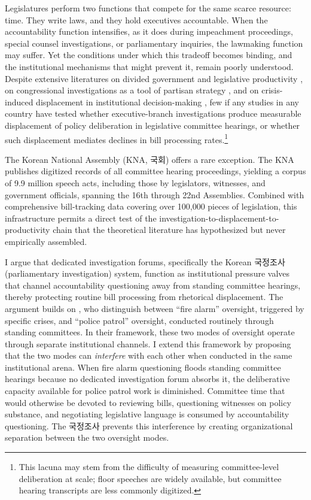 \documentclass[11pt]{article}
\begin{document}
Legislatures perform two functions that compete for the same scarce resource: time. They write laws, and they hold executives accountable. When the accountability function intensifies, as it does during impeachment proceedings, special counsel investigations, or parliamentary inquiries, the lawmaking function may suffer. Yet the conditions under which this tradeoff becomes binding, and the institutional mechanisms that might prevent it, remain poorly understood. Despite extensive literatures on divided government and legislative productivity \citep{mayhew1991, edwards1997}, on congressional investigations as a tool of partisan strategy \citep{kriner2008}, and on crisis-induced displacement in institutional decision-making \citep{epstein2005}, few if any studies in any country have tested whether executive-branch investigations produce measurable displacement of policy deliberation in legislative committee hearings, or whether such displacement mediates declines in bill processing rates.\footnote{This lacuna may stem from the difficulty of measuring committee-level deliberation at scale; floor speeches are widely available, but committee hearing transcripts are less commonly digitized.}

The Korean National Assembly (KNA, 국회) offers a rare exception. The KNA publishes digitized records of all committee hearing proceedings, yielding a corpus of 9.9 million speech acts, including those by legislators, witnesses, and government officials, spanning the 16th through 22nd Assemblies. Combined with comprehensive bill-tracking data covering over 100,000 pieces of legislation, this infrastructure permits a direct test of the investigation-to-displacement-to-productivity chain that the theoretical literature has hypothesized but never empirically assembled.

I argue that dedicated investigation forums, specifically the Korean 국정조사 (parliamentary investigation) system, function as institutional pressure valves that channel accountability questioning away from standing committee hearings, thereby protecting routine bill processing from rhetorical displacement. The argument builds on \citet{mccubbins1989}, who distinguish between ``fire alarm'' oversight, triggered by specific crises, and ``police patrol'' oversight, conducted routinely through standing committees. In their framework, these two modes of oversight operate through separate institutional channels. I extend this framework by proposing that the two modes can \textit{interfere} with each other when conducted in the same institutional arena. When fire alarm questioning floods standing committee hearings because no dedicated investigation forum absorbs it, the deliberative capacity available for police patrol work is diminished. Committee time that would otherwise be devoted to reviewing bills, questioning witnesses on policy substance, and negotiating legislative language is consumed by accountability questioning. The 국정조사 prevents this interference by creating organizational separation between the two oversight modes.
\end{document}
